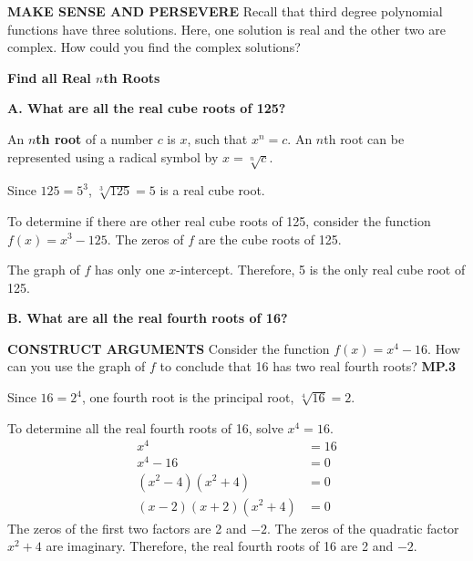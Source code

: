 \documentclass{article}
\newenvironment{example}[1]{}{}
\begin{document}
\textbf{MAKE SENSE AND PERSEVERE}
Recall that third degree polynomial functions have three solutions. Here, one solution is real and the other two are complex. How could you find the complex solutions?

\begin{example}{1}
\textbf{Find all Real $n$th Roots}

\textbf{A. What are all the real cube roots of 125?}

An \textbf{$n$th root} of a number $c$ is $x$, such that $x^n = c$. An $n$th root can be represented using a radical symbol by $x = \sqrt[n]{c}$.

Since $125 = 5^3$, $\sqrt[3]{125} = 5$ is a real cube root.

To determine if there are other real cube roots of 125, consider the function $f(x) = x^3 - 125$. The zeros of $f$ are the cube roots of 125.

The graph of $f$ has only one $x$-intercept. Therefore, 5 is the only real cube root of 125.


\textbf{B. What are all the real fourth roots of 16?}

\textbf{CONSTRUCT ARGUMENTS}
Consider the function $f(x) = x^4 - 16$. How can you use the graph of $f$ to conclude that 16 has two real fourth roots? \textbf{MP.3}

Since $16 = 2^4$, one fourth root is the principal root, $\sqrt[4]{16} = 2$.

To determine all the real fourth roots of 16, solve $x^4 = 16$.
\begin{align*}
x^4 &= 16 \\
x^4 - 16 &= 0 \\
(x^2 - 4)(x^2 + 4) &= 0 \\
(x - 2)(x + 2)(x^2 + 4) &= 0
\end{align*}
The zeros of the first two factors are 2 and $-2$. The zeros of the quadratic factor $x^2 + 4$ are imaginary. Therefore, the real fourth roots of 16 are 2 and $-2$.
\end{example}
\end{document}
